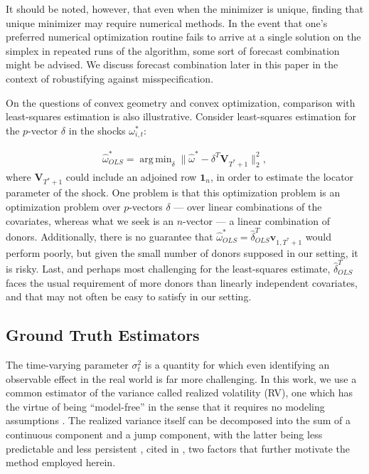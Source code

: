 \documentclass[11pt,3p,review,authoryear]{elsarticle}
\newcommand{\x}{\textbf{v}}
\DeclareMathOperator*{\argmin}{arg\,min} %
\theoremstyle{definition}
\begin{document}
It should be noted, however, that even when the minimizer is unique, finding that unique minimizer may require numerical methods.  In the event that one's preferred numerical optimization routine fails to arrive at a single solution on the simplex in repeated runs of the algorithm, some sort of forecast combination might be advised.  We discuss forecast combination later in this paper in the context of robustifying against misspecification.

On the questions of convex geometry and convex optimization, comparison with least-squares estimation is also illustrative.  Consider least-squares estimation for the $p$-vector $\delta$ in the shocks $\omega^{*}_{i,t}$:

\begin{align*}
 \hat\omega^{*}_{OLS} =\argmin_{\delta}\|\hat{\omega}^{*} - \delta^{T}\textbf{V}_{T^{*}+1}\|^{2}_{2},
\end{align*}
where $\textbf{V}_{T^{*}+1}$ could include an adjoined row $\textbf{1}_{n}$, in order to estimate the locator parameter of the shock.  One problem is that this optimization problem is an optimization problem over $p$-vectors $\delta$ --- over linear combinations of the covariates, whereas what we seek is an $n$-vector --- a linear combination of donors.  Additionally, there is no guarantee that $\hat\omega^{*}_{OLS} = \hat{\delta}_{OLS}^{T}\x_{1,T^{*}+1}$ would perform poorly, but given the small number of donors supposed in our setting, it is risky.  Last, and perhaps most challenging for the least-squares estimate, $\hat{\delta}_{OLS}^{T}$ faces the usual requirement of more donors than linearly independent covariates, and that may not often be easy to satisfy in our setting.

\subsection{Ground Truth Estimators}
    \label{Ground Truth Estimators}
    
    The time-varying parameter $\sigma^{2}_{t}$ is a quantity for which even identifying an observable effect in the real world is far more challenging.  In this work, we use a common estimator of the variance called realized volatility (RV), one which has the virtue of being ``model-free'' in the sense that it requires no modeling assumptions \citep{andersen2010stochastic}.  The realized variance itself can be decomposed into the sum of a continuous component and a jump component, with the latter being less predictable and less persistent \citep{andersen2007roughing}, cited in \citet{de2006forecasting}, two factors that further motivate the method employed herein.
    
\end{document}
